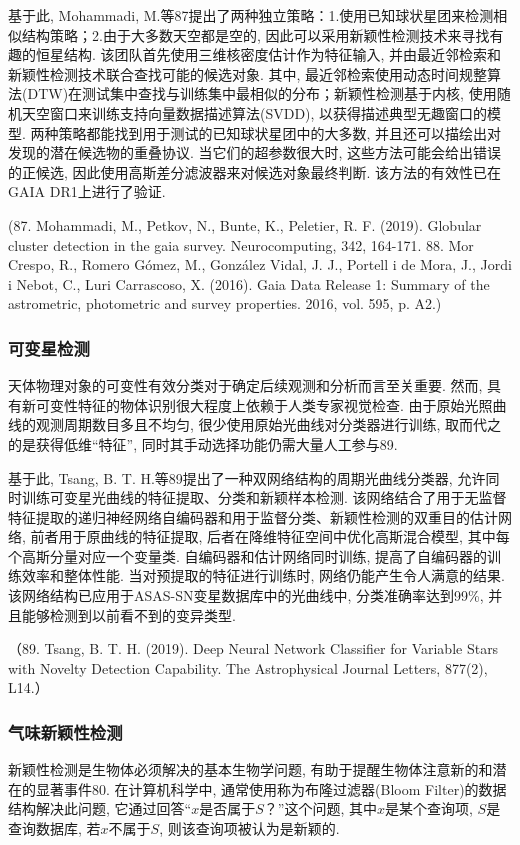 \documentclass{Style/aas}
\begin{document}
\begin{multicols}{2}
  基于此, Mohammadi, M.等87提出了两种独立策略：1.使用已知球状星团来检测相似结构策略；2.由于大多数天空都是空的,  因此可以采用新颖性检测技术来寻找有趣的恒星结构. 该团队首先使用三维核密度估计作为特征输入, 并由最近邻检索和新颖性检测技术联合查找可能的候选对象. 其中, 最近邻检索使用动态时间规整算法(DTW)在测试集中查找与训练集中最相似的分布；新颖性检测基于内核, 使用随机天空窗口来训练支持向量数据描述算法(SVDD), 以获得描述典型无趣窗口的模型. 两种策略都能找到用于测试的已知球状星团中的大多数, 并且还可以描绘出对发现的潜在候选物的重叠协议. 当它们的超参数很大时, 这些方法可能会给出错误的正候选, 因此使用高斯差分滤波器来对候选对象最终判断. 该方法的有效性已在GAIA DR1上进行了验证.

  (87.	Mohammadi, M., Petkov, N., Bunte, K., Peletier, R. F. (2019). Globular cluster detection in the gaia survey. Neurocomputing, 342, 164-171.
  88.	Mor Crespo, R., Romero Gómez, M., González Vidal, J. J., Portell i de Mora, J., Jordi i Nebot, C., Luri Carrascoso, X. (2016). Gaia Data Release 1: Summary of the astrometric, photometric and survey properties. 2016, vol. 595, p. A2.)

  \subsubsection{可变星检测}
  天体物理对象的可变性有效分类对于确定后续观测和分析而言至关重要. 然而, 具有新可变性特征的物体识别很大程度上依赖于人类专家视觉检查. 由于原始光照曲线的观测周期数目多且不均匀, 很少使用原始光曲线对分类器进行训练, 取而代之的是获得低维“特征”, 同时其手动选择功能仍需大量人工参与89.

  基于此, Tsang, B. T. H.等89提出了一种双网络结构的周期光曲线分类器, 允许同时训练可变星光曲线的特征提取、分类和新颖样本检测. 该网络结合了用于无监督特征提取的递归神经网络自编码器和用于监督分类、新颖性检测的双重目的估计网络, 前者用于原曲线的特征提取, 后者在降维特征空间中优化高斯混合模型, 其中每个高斯分量对应一个变量类. 自编码器和估计网络同时训练, 提高了自编码器的训练效率和整体性能. 当对预提取的特征进行训练时, 网络仍能产生令人满意的结果. 该网络结构已应用于ASAS-SN变星数据库中的光曲线中, 分类准确率达到99\%, 并且能够检测到以前看不到的变异类型.

  （89.	Tsang, B. T. H. (2019). Deep Neural Network Classifier for Variable Stars with Novelty Detection Capability. The Astrophysical Journal Letters, 877(2), L14.）

  \subsubsection{气味新颖性检测}
  新颖性检测是生物体必须解决的基本生物学问题, 有助于提醒生物体注意新的和潜在的显著事件80. 在计算机科学中, 通常使用称为布隆过滤器(Bloom Filter)的数据结构解决此问题, 它通过回答“$x$是否属于$S$？”这个问题, 其中$x$是某个查询项, $S$是查询数据库, 若$x$不属于$S$, 则该查询项被认为是新颖的.


\end{multicols}
\end{document}
